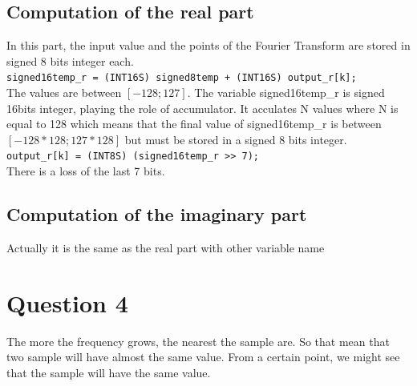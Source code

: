 \documentclass[a4paper]{article}
\begin{document}
\subsection{Computation of the real part}

In this part, the input value and the points of the Fourier Transform are stored in signed 8 bits integer each. 
\\
\verb|signed16temp_r = (INT16S) signed8temp + (INT16S) output_r[k];|
\\
The values are between $[-128;127]$. The variable signed16temp\_r is signed 16bits integer, playing the role of accumulator. It acculates N values where N is equal to 128 which means that the final value of signed16temp\_r is between $[-128*128;127*128]$ but must be stored in a signed 8 bits integer. 
\\
\verb|output_r[k] = (INT8S) (signed16temp_r >> 7);|
\\

There is a loss of the last 7 bits. 

\subsection{Computation of the imaginary part}

Actually it is the same as the real part with other variable name

\section{Question 4}
The more the frequency grows, the nearest the sample are. So that mean that two sample will have almost the same value. From a certain point, we might see that the sample will have the same value.

\end{document}
